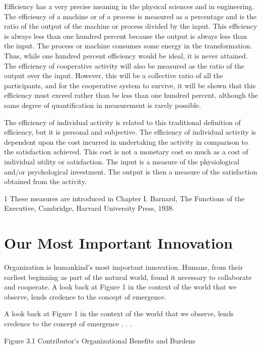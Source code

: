 Efficiency has a very precise meaning in the physical sciences and in engineering. The efficiency of a machine or of a process is measured as a percentage and is the ratio of the output of the machine or process divided by the input. This efficiency is always less than one hundred percent because the output is always less than the input. The process or machine consumes some energy in the transformation. Thus, while one hundred percent efficiency would be ideal, it is never attained. The efficiency of cooperative activity will also be measured as the ratio of the output over the input. However, this will be a collective ratio of all the participants, and for the cooperative system to survive, it will be shown that this efficiency must exceed rather than be less than one hundred percent, although the same degree of quantification in measurement is rarely possible.

The efficiency of individual activity is related to this traditional definition of efficiency, but it is personal and subjective. The efficiency of individual activity is dependent upon the cost incurred in undertaking the activity in comparison to the satisfaction achieved. This cost is not a monetary cost so much as a cost of individual utility or satisfaction. The input is a measure of the physiological and/or psychological investment. The output is then a measure of the satisfaction obtained from the activity.

    1 These measures are introduced in Chapter I. Barnard, The Functions of the Executive, Cambridge, Harvard University Press, 1938.


\section{Our Most Important Innovation}


Organization is humankind’s most important innovation. Humans, from their earliest beginning as part of the natural world, found it necessary to collaborate and cooperate. A look back at Figure 1 in the context of the world that we observe, lends credence to the concept of emergence.

A look back at Figure 1 in the context of the world that we observe, lends credence to the concept of emergence . . . 

Figure 3.1 Contributor’s Organizational Benefits and Burdens

